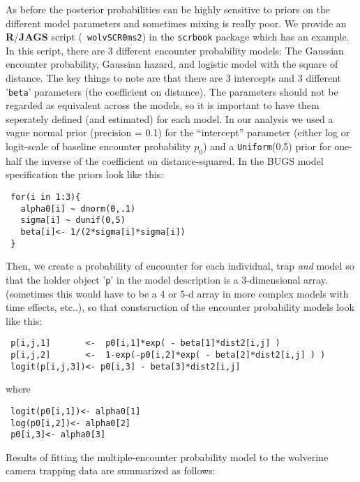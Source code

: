 As before the posterior probabilities can be highly sensitive to
priors on the different model parameters and sometimes mixing is
really poor.  We provide an {\bf R}/{\bf JAGS} script (\mbox{\tt
  wolvSCR0ms2}) in the \mbox{\tt scrbook} package which has an
example.  In this script, there are 3 different encounter probability
models:
The Gaussian encounter probability, Gaussian hazard, and logistic
model with the square of distance.  The key things to note are that
there are 3 intercepts and 3 different '\mbox{\tt beta}' parameters
(the coefficient on distance). The parameters should not be regarded
as equivalent across the models, so it is important to have them
seperately defined (and estimated) for each model.  In our analysis we
used a vague normal prior (precision = 0.1) for the ``intercept''
parameter (either log or logit-scale of baseline encounter probability
$p_{0}$) and a \mbox{\tt Uniform}(0,5) prior for one-half the inverse of the
coefficient on distance-squared.
In the BUGS model specification the priors look like this:
\begin{verbatim}
 for(i in 1:3){
   alpha0[i] ~ dnorm(0,.1)
   sigma[i] ~ dunif(0,5)
   beta[i]<- 1/(2*sigma[i]*sigma[i])
 }
\end{verbatim}
Then,  we create a probability of encounter for each
individual, trap {\it and} model so that the holder object '\mbox{\tt p}' in the
model description is a 3-dimensional array. (sometimes this would have to be a 4
or 5-d array in more complex models with time effects, etc..), so that
constsruction of the encounter probability models look like this:
\begin{verbatim}
 p[i,j,1]       <-  p0[i,1]*exp( - beta[1]*dist2[i,j] )
 p[i,j,2]       <-  1-exp(-p0[i,2]*exp( - beta[2]*dist2[i,j] ) )
 logit(p[i,j,3])<- p0[i,3] - beta[3]*dist2[i,j]
\end{verbatim}
where
\begin{verbatim}
 logit(p0[i,1])<- alpha0[1]
 log(p0[i,2])<- alpha0[2]
 p0[i,3]<- alpha0[3]
\end{verbatim}
Results of fitting the multiple-encounter probability model to the
wolverine camera trapping data are summarized as follows:

